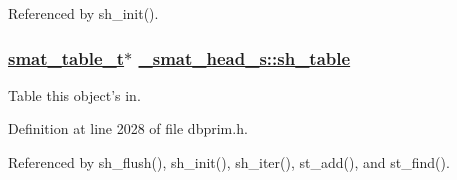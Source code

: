 Referenced by sh\_\-init().\hypertarget{struct__smat__head__s_o2}{
\subsubsection[sh\_\-table]{\setlength{\rightskip}{0pt plus 5cm}\hyperlink{struct__smat__table__s}{smat\_\-table\_\-t}$\ast$ \hyperlink{struct__smat__head__s_o2}{\_\-smat\_\-head\_\-s::sh\_\-table}}}
\label{struct__smat__head__s_o2}


Table this object's in. 

Definition at line 2028 of file dbprim.h.

Referenced by sh\_\-flush(), sh\_\-init(), sh\_\-iter(), st\_\-add(), and st\_\-find().